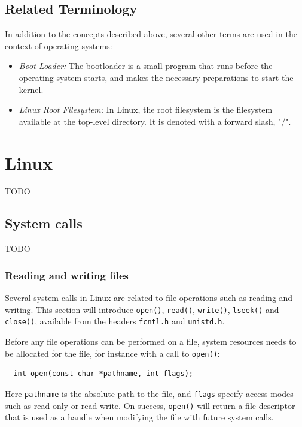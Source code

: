 \subsection{Related Terminology}
In addition to the concepts described above, several other terms are used in the context of operating systems:
\begin{itemize}
\item \textsl{Boot Loader:} The bootloader is a small program that runs before the operating system starts, and makes the necessary preparations to start the kernel.
\item \textsl{Linux Root Filesystem:} In Linux, the root filesystem is the filesystem available at the top-level directory. It is denoted with a forward slash, "/".
\end{itemize}


\section{Linux}
TODO %

\subsection{System calls}
TODO %

\subsubsection{Reading and writing files}\label{sec:reading-and-writing-files}
Several system calls in Linux are related to file operations such as reading and writing. This section will introduce \texttt{open()}, \texttt{read()}, \texttt{write()}, \texttt{lseek()} and \texttt{close()}, available from the headers \texttt{fcntl.h} and \texttt{unistd.h}.

Before any file operations can be performed on a file, system resources needs to be allocated for the file, for instance with a call to \texttt{open()}:
\begin{verbatim}
  int open(const char *pathname, int flags);
\end{verbatim}
Here \texttt{pathname} is the absolute path to the file, and \texttt{flags} specify access modes such as read-only or read-write. On success, \texttt{open()} will return a file descriptor that is used as a handle when modifying the file with future system calls.

